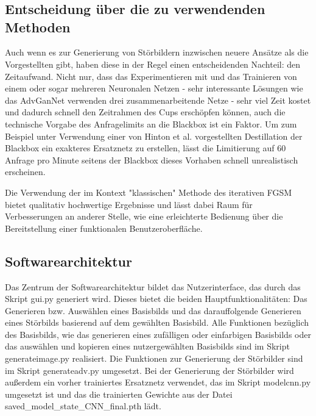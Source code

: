 \chapter{}
\label{cha:methods}

\section{Entscheidung über die zu verwendenden Methoden}

Auch wenn es zur Generierung von Störbildern inzwischen neuere Ansätze als die Vorgestellten gibt, haben diese in der Regel einen entscheidenden Nachteil: den Zeitaufwand. Nicht nur, dass das Experimentieren mit und das Trainieren von einem oder sogar mehreren Neuronalen Netzen - sehr interessante Lösungen wie das AdvGanNet verwenden drei zusammenarbeitende Netze - sehr viel Zeit kostet und dadurch schnell den Zeitrahmen des Cups erschöpfen können, auch die technische Vorgabe des Anfragelimits an die Blackbox ist ein Faktor. Um zum Beispiel unter Verwendung einer von Hinton et al. vorgestellten Destillation der Blackbox ein exakteres Ersatznetz zu erstellen, lässt die Limitierung auf 60 Anfrage pro Minute seitens der Blackbox dieses Vorhaben schnell unrealistisch erscheinen.

Die Verwendung der im Kontext "klassischen" Methode des iterativen FGSM bietet qualitativ hochwertige Ergebnisse und lässt dabei Raum für Verbesserungen an anderer Stelle, wie eine erleichterte Bedienung über die Bereitstellung einer funktionalen Benutzeroberfläche.

\section{Softwarearchitektur}

Das Zentrum der Softwarearchitektur bildet das Nutzerinterface, das durch das Skript gui.py generiert wird. Dieses bietet die beiden Hauptfunktionalitäten:
Das Generieren bzw. Auswählen eines Basisbilds und das darauffolgende Generieren eines Störbilds basierend auf dem gewählten Basisbild.
Alle Funktionen bezüglich des Basisbilds, wie das generieren eines zufälligen oder einfarbigen Basisbilds oder das auswählen und kopieren eines nutzergewählten Basisbilds sind im Skript generateimage.py realisiert. 
Die Funktionen zur Generierung der Störbilder sind im Skript generateadv.py umgesetzt. Bei der Generierung der Störbilder wird außerdem ein vorher trainiertes Ersatznetz verwendet, das im Skript modelcnn.py umgesetzt ist und das die trainierten Gewichte aus der Datei saved_model_state_CNN_final.pth lädt.

